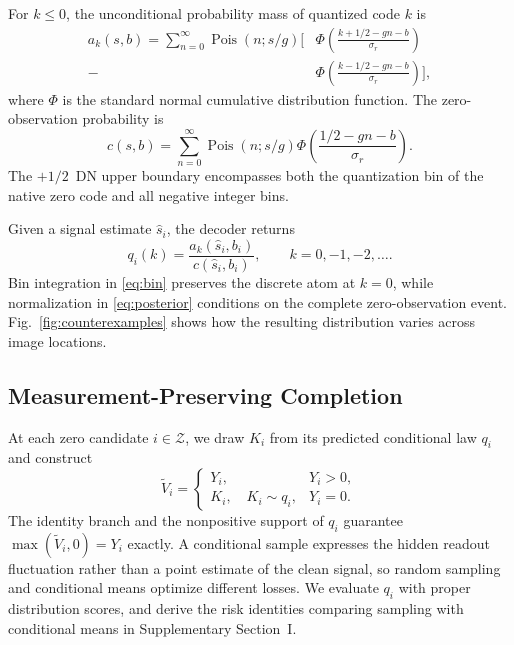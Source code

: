 \documentclass[10pt,twocolumn,journal]{IEEEtran}
\begin{document}
For $k\leq0$, the unconditional probability mass of quantized code $k$ is
\begin{align}
a_k(s,b)=\sum_{n=0}^{\infty}\operatorname{Pois}(n;s/g)
\bigg[&\Phi\!\left(\frac{k+1/2-gn-b}{\sigma_r}\right)\nonumber\\[-2pt]
-&\Phi\!\left(\frac{k-1/2-gn-b}{\sigma_r}\right)\bigg],\label{eq:bin}
\end{align}
where $\Phi$ is the standard normal cumulative distribution function. The zero-observation probability is
\begin{equation}
c(s,b)=\sum_{n=0}^{\infty}\operatorname{Pois}(n;s/g)
\Phi\!\left(\frac{1/2-gn-b}{\sigma_r}\right).\label{eq:zeroevent}
\end{equation}
The $+1/2$~DN upper boundary encompasses both the quantization bin of the native zero code and all negative integer bins.

Given a signal estimate $\hat s_i$, the decoder returns
\begin{equation}
q_i(k)=\frac{a_k(\hat s_i,b_i)}{c(\hat s_i,b_i)},\qquad k=0,-1,-2,\ldots.\label{eq:posterior}
\end{equation}
Bin integration in \eqref{eq:bin} preserves the discrete atom at $k=0$, while normalization in \eqref{eq:posterior} conditions on the complete zero-observation event. Fig.~\ref{fig:counterexamples} shows how the resulting distribution varies across image locations.

\subsection{Measurement-Preserving Completion}
At each zero candidate $i\in\mathcal Z$, we draw $K_i$ from its predicted conditional law $q_i$ and construct
\begin{equation}
\widetilde V_i=\begin{cases}
Y_i,&Y_i>0,\\
K_i,\quad K_i\sim q_i,&Y_i=0.
\end{cases}\label{eq:output}
\end{equation}
The identity branch and the nonpositive support of $q_i$ guarantee $\max(\widetilde V_i,0)=Y_i$ exactly. A conditional sample expresses the hidden readout fluctuation rather than a point estimate of the clean signal, so random sampling and conditional means optimize different losses. We evaluate $q_i$ with proper distribution scores, and derive the risk identities comparing sampling with conditional means in Supplementary Section~I.
\end{document}
